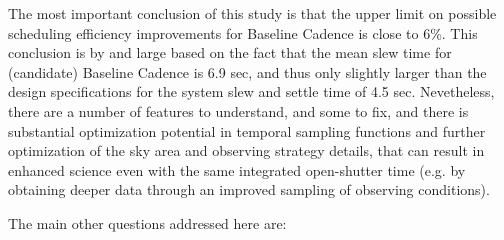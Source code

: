\documentclass[manuscript]{article}
\begin{document}
The most important conclusion of this study is that the upper limit on possible 
scheduling efficiency improvements for Baseline Cadence is close to 6\%. This 
conclusion is by and large based on the fact that the mean slew time for (candidate)
Baseline Cadence is 6.9 sec, and thus only slightly larger than the design specifications 
for the system slew and settle time of 4.5 sec.  Nevetheless, there are a number of
features to understand, and some to fix, and there is substantial optimization 
potential in temporal sampling functions and further optimization of the sky area
and observing strategy details, that can result in enhanced science even with the
same integrated open-shutter time (e.g. by obtaining deeper data through an
improved sampling of observing conditions). 

\vskip 0.2in
The main other questions addressed here are: 
\end{document}
